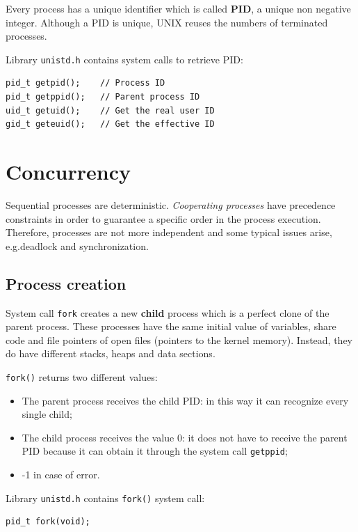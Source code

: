 Every process has a unique identifier which is called \textbf{PID}, a unique non negative integer. Although a PID is unique, UNIX reuses the numbers of terminated processes.

Library \texttt{unistd.h} contains system calls to retrieve PID:
\begin{verbatim}
pid_t getpid();    // Process ID
pid_t getppid();   // Parent process ID
uid_t getuid();    // Get the real user ID
gid_t geteuid();   // Get the effective ID
\end{verbatim}
\section{Concurrency}
Sequential processes are deterministic. \textit{Cooperating processes} have precedence constraints in order to guarantee a specific order in the process execution. Therefore, processes are not more independent and some typical issues arise, e.g.\@ deadlock and synchronization.

\subsection{Process creation}
System call \texttt{fork} creates a new \textbf{child} process which is a perfect clone of the parent process. These processes have the same initial value of variables, share code and file pointers of open files (pointers to the kernel memory). Instead, they do have different stacks, heaps and data sections.

\texttt{fork()} returns two different values:
\begin{itemize}
\item The parent process receives the child PID: in this way it can recognize every single child;
\item The child process receives the value 0: it does not have to receive the parent PID because it can obtain it through the system call \texttt{getppid};
\item -1 in case of error.
\end{itemize}

Library \texttt{unistd.h} contains \texttt{fork()} system call:
\begin{verbatim}
pid_t fork(void);
\end{verbatim}


